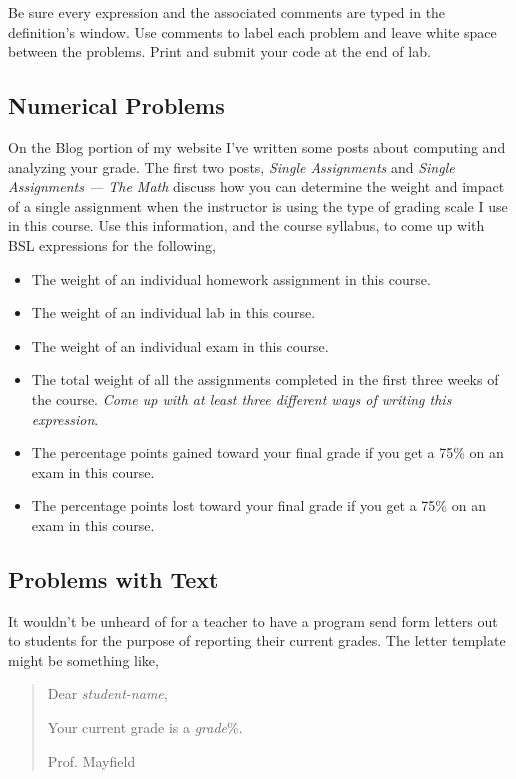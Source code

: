 \documentclass[nobib]{tufte-handout}
\begin{document}
Be sure every expression and the associated comments are typed in the definition's window. Use comments to label each problem and leave white space between the problems. Print and submit your code at the end of lab.

\subsection{Numerical Problems}

On the Blog portion of my website I've written some posts about computing and analyzing your grade. The first two posts, \textit{Single Assignments} and \textit{Single Assignments --- The Math} discuss how you can determine the weight and impact of a single assignment when the instructor is using the type of grading scale I use in this course. Use this information, and the course syllabus, to come up with BSL expressions for the following,
\begin{itemize}
  \item The weight of an individual homework assignment in this course.
  \item The weight of an individual lab in this course.
  \item The weight of an individual exam in this course.
  \item The total weight of all the assignments completed in the first three weeks of the course. \textit{Come up with at least three different ways of writing this expression}.
  \item The percentage points gained toward your final grade if you get a 75\% on an exam in this course.
  \item The percentage points lost toward your final grade if you get a 75\% on an exam in this course.
\end{itemize}

\subsection{Problems with Text}

It wouldn't be unheard of for a teacher to have a program send form letters out to students for the purpose of reporting their current grades. The letter template might be something like,

\begin{quote}
  Dear \textit{student-name},

  Your current grade is a \textit{grade}\%.

  Prof. Mayfield
\end{quote}
\end{document}
